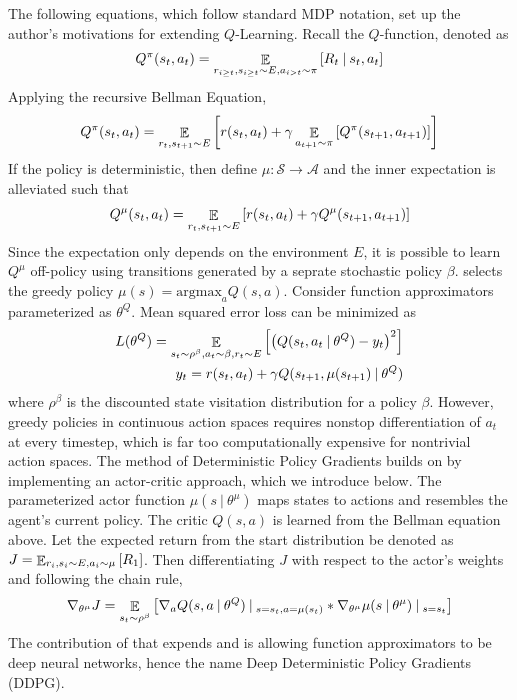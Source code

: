 The following equations, which follow standard MDP notation, set up the author's motivations for extending $Q$-Learning. Recall
the $Q$-function, denoted as
\begin{align*}
  Q^\pi(s_t, a_t) = \mathop{\mathbb{E}}_{r_{i \geq t}, s_{i \geq t} \sim E, a_{i > t} \sim \pi}\left[R_t \:|\: s_t, a_t\right]
\end{align*}
Applying the recursive Bellman Equation, 
\begin{align*}
  Q^\pi(s_t, a_t) = \mathop{\mathbb{E}}_{r_t, s_{t+1} \sim E} \left[r(s_t, a_t) + \gamma \mathop{\mathbb{E}}_{a_{t+1}\sim\pi}\left[Q^\pi(s_{t+1}, a_{t+1})\right]\right]
\end{align*}
If the policy is deterministic, then define $\mu: \mathcal{S} \to \mathcal{A}$ and the inner expectation is alleviated such that 
\begin{align*}
  Q^\mu(s_t, a_t) = \mathop{\mathbb{E}}_{r_t, s_{t+1} \sim E} \left[r(s_t, a_t) + \gamma Q^\mu(s_{t+1}, a_{t+1})\right]
\end{align*}
Since the expectation only depends on the environment $E$, it is possible to learn $Q^\mu$ off-policy 
using transitions generated by a seprate stochastic policy $\beta$. 
\cite{q-learning} selects the greedy policy $\mu(s) = \text{argmax}_a Q(s, a)$.
Consider function approximators parameterized as $\theta^Q$. Mean squared error loss can be minimized as 
\begin{align*}
L(\theta^Q) = \mathop{\mathbb{E}}_{s_t \sim \rho^\beta, a_t \sim \beta, r_t \sim E} \left[ \left(Q(s_t, a_t \:|\: \theta^Q) - y_t\right)^2 \right]\\
y_t = r(s_t, a_t) + \gamma Q(s_{t+1}, \mu(s_{t+1}) \:|\: \theta^Q)
\end{align*} 
where $\rho^\beta$ is the discounted state visitation distribution for a policy $\beta$.
However, greedy policies in continuous action spaces requires nonstop differentiation of $a_t$ at every timestep, 
which is far too computationally expensive for nontrivial action spaces. The method of Deterministic Policy Gradients \cite{dpg} builds 
on \cite{q-learning} by implementing an actor-critic approach, which we introduce below.
The parameterized actor function $\mu(s \:|\: \theta^\mu)$ maps states to actions and resembles the agent's current policy.
The critic $Q(s, a)$ is learned from the Bellman equation above. Let the expected return from the start distribution be denoted as 
$J = \mathop{\mathbb{E}}_{r_i, s_i \sim E, a_i \sim \mu}\left[ R_1 \right]$. Then differentiating $J$ with respect to the actor's weights and following the chain rule,
\begin{align*}
  \nabla_{\theta^\mu} J = \mathop{\mathbb{E}}_{s_t \sim \rho^\beta} \left[ \nabla_a Q(s, a \:|\: \theta^Q) \:|\:_{s=s_t, a=\mu(s_t)} * \nabla_{\theta^\mu} \mu(s \:|\: \theta^\mu) \:|\:_{s=s_t}\right]
\end{align*}
The contribution of \cite{ddpg} that expends \cite{q-learning} and \cite{dpg} is allowing function approximators to be 
deep neural networks, hence the name Deep Deterministic Policy Gradients (DDPG). 

